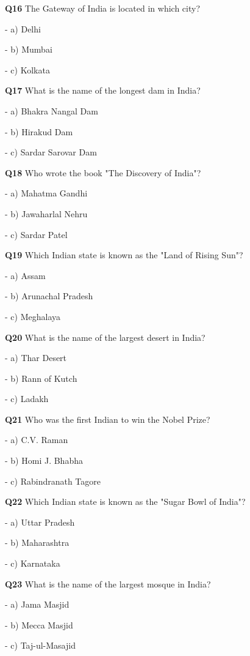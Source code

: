 \textbf{Q16} The Gateway of India is located in which city?\par
\quad - a) Delhi\par
\quad - b) Mumbai\par
\quad - c) Kolkata\par

\textbf{Q17} What is the name of the longest dam in India?\par
\quad - a) Bhakra Nangal Dam\par
\quad - b) Hirakud Dam\par
\quad - c) Sardar Sarovar Dam\par

\textbf{Q18} Who wrote the book "The Discovery of India"?\par
\quad - a) Mahatma Gandhi\par
\quad - b) Jawaharlal Nehru\par
\quad - c) Sardar Patel\par

\textbf{Q19} Which Indian state is known as the "Land of Rising Sun"?\par
\quad - a) Assam\par
\quad - b) Arunachal Pradesh\par
\quad - c) Meghalaya\par

\textbf{Q20} What is the name of the largest desert in India?\par
\quad - a) Thar Desert\par
\quad - b) Rann of Kutch\par
\quad - c) Ladakh\par

\textbf{Q21} Who was the first Indian to win the Nobel Prize?\par
\quad - a) C.V. Raman\par
\quad - b) Homi J. Bhabha\par
\quad - c) Rabindranath Tagore\par

\textbf{Q22} Which Indian state is known as the "Sugar Bowl of India"?\par
\quad - a) Uttar Pradesh\par
\quad - b) Maharashtra\par
\quad - c) Karnataka\par

\textbf{Q23} What is the name of the largest mosque in India?\par
\quad - a) Jama Masjid\par
\quad - b) Mecca Masjid\par
\quad - c) Taj-ul-Masajid\par

